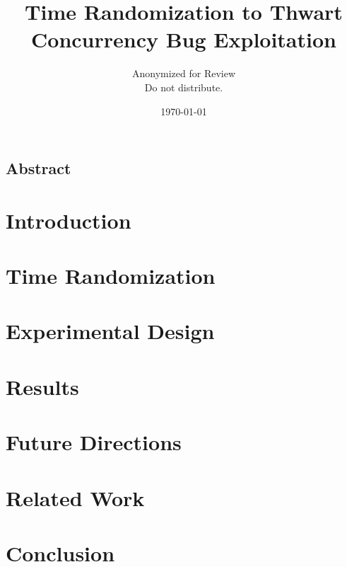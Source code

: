 \documentclass[letterpaper,twocolumn,10pt]{article}
\begin{document}
\date{\today}

\title{\Large \bf Time Randomization to Thwart Concurrency Bug Exploitation}

\author{
{\rm Anonymized for Review}\\
Do not distribute.
} %

\maketitle

\subsection*{Abstract}


\section{Introduction}


\section{Time Randomization}


\section{Experimental Design}


\section{Results}


\section{Future Directions}


\section{Related Work}


\section{Conclusion}



{\footnotesize 
}
\end{document}
